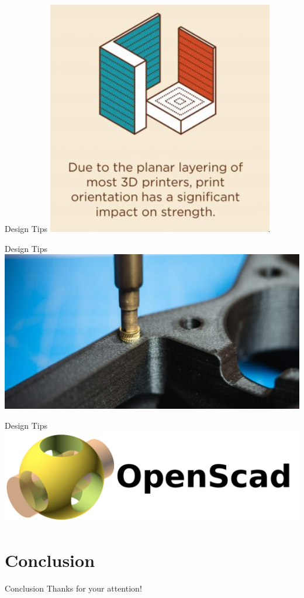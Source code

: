 \documentclass{presentation}
\begin{document}
\begin{frame}{Design Tips}
  \centering
  \includegraphics[width=\textwidth/2]{./strength.jpg}
\end{frame}

\begin{frame}{Design Tips}
  \centering
  \includegraphics[width=\textwidth]{./heatset}
\end{frame}

\begin{frame}{Design Tips}
  \centering
  \includegraphics[width=\textwidth]{./OPENSCADLOGO.png}
\end{frame}

\section{Conclusion}

\begin{frame}{Conclusion}
  Thanks for your attention!
\end{frame}
\end{document}
